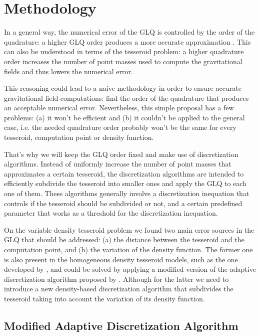 \documentclass[extra]{gji}
\begin{document}

\section{Methodology}

In a general way, the numerical error of the GLQ is controlled by the 
order of the quadrature: a higher GLQ order produces a more accurate 
approximation \citep{Hildebrand1987}.
This can also be understood in terms of the tesseroid problem: a higher 
quadrature order increases the number of point masses used to compute 
the gravitational fields and thus lowers the numerical error.

This reasoning could lead to a naive methodology in order to ensure 
accurate gravitational field computations: find the order of the 
quadrature that produces an acceptable numerical error.
Nevertheless, this simple proposal has a few problems: (a) it won't be 
efficient \citep{Li2011, Uieda2016} and (b) it couldn't be applied to 
the general case, i.e. the needed quadrature order probably won't be 
the same for every tesseroid, computation point or density function.

That's why we will keep the GLQ order fixed and make use of 
discretization algorithms.
Instead of uniformly increase the number of point masses that 
approximates a certain tesseroid, the discretization algorithms are 
intended to efficiently subdivide the tesseroid into smaller ones and 
apply the GLQ to each one of them.
These algorithms generally involve a discretization inequation that 
controls if the tesseroid should be subdivided or not, and a certain 
predefined parameter that works as a threshold for the discretization 
inequation.

On the variable density tesseroid problem we found two main error 
sources in the GLQ that should be addressed: (a) the distance between 
the tesseroid and the computation point, and (b) 
the variation of the density function.
The former one is also present in the homogeneous density tesseroid 
models, such as the one developed by \citet{Uieda2016}, and could be 
solved by applying a modified version of the adaptive discretization 
algorithm proposed by \citet{Li2011}.
Although for the latter we need to introduce a new density-based 
discretization algorithm that subdivides the tesseroid taking into 
account the variation of its density function.


\subsection{Modified Adaptive Discretization Algorithm}
\end{document}

